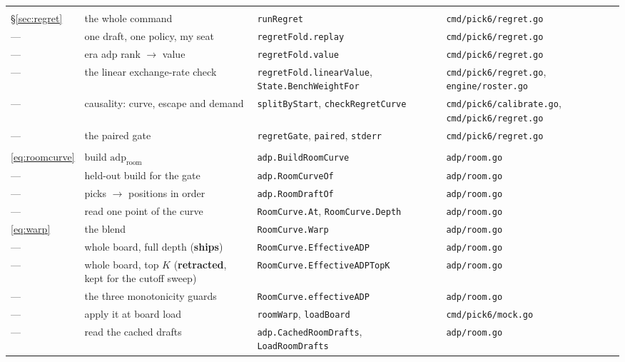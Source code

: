 \documentclass[10pt,a4paper]{article}
\theoremstyle{plain}
\theoremstyle{definition}
\theoremstyle{remark}
\newcommand{\code}[1]{\texttt{\small #1}}
\newcommand{\adp}{\mathrm{adp}}
\begin{document}
\begin{longtable}{@{}p{}p{}p{}p{}@{}}
\addlinespace
\multicolumn{4}{@{}l}{\emph{Replay-regret --- the decision referee}}\\[0.2em]
\S\ref{sec:regret} & the whole command & \code{runRegret} & \code{cmd/pick6/regret.go} \\
--- & one draft, one policy, my seat & \code{regretFold.replay} & \code{cmd/pick6/regret.go} \\
--- & era adp rank $\to$ value & \code{regretFold.value} & \code{cmd/pick6/regret.go} \\
--- & the linear exchange-rate check & \code{regretFold.linearValue}, \code{State.BenchWeightFor} & \code{cmd/pick6/regret.go}, \code{engine/roster.go} \\
--- & causality: curve, escape and demand & \code{splitByStart}, \code{checkRegretCurve} & \code{cmd/pick6/calibrate.go}, \code{cmd/pick6/regret.go} \\
--- & the paired gate & \code{regretGate}, \code{paired}, \code{stderr} & \code{cmd/pick6/regret.go} \\

\addlinespace
\multicolumn{4}{@{}l}{\emph{Room warp}}\\[0.2em]
\eqref{eq:roomcurve} & build $\adp_{\text{room}}$ & \code{adp.BuildRoomCurve} & \code{adp/room.go} \\
--- & held-out build for the gate & \code{adp.RoomCurveOf} & \code{adp/room.go} \\
--- & picks $\to$ positions in order & \code{adp.RoomDraftOf} & \code{adp/room.go} \\
--- & read one point of the curve & \code{RoomCurve.At}, \code{RoomCurve.Depth} & \code{adp/room.go} \\
\eqref{eq:warp} & the blend & \code{RoomCurve.Warp} & \code{adp/room.go} \\
--- & whole board, full depth (\textbf{ships}) & \code{RoomCurve.EffectiveADP} & \code{adp/room.go} \\
--- & whole board, top $K$ (\textbf{retracted}, kept for the cutoff sweep) & \code{RoomCurve.EffectiveADPTopK} & \code{adp/room.go} \\
--- & the three monotonicity guards & \code{RoomCurve.effectiveADP} & \code{adp/room.go} \\
--- & apply it at board load & \code{roomWarp}, \code{loadBoard} & \code{cmd/pick6/mock.go} \\
--- & read the cached drafts & \code{adp.CachedRoomDrafts}, \code{LoadRoomDrafts} & \code{adp/room.go} \\


\end{longtable}
\end{document}
